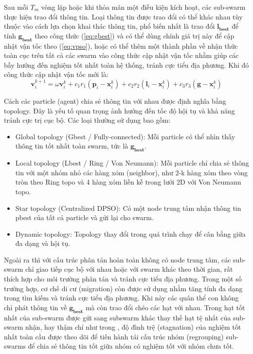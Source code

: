 Sau mỗi $T_m$ vòng lặp hoặc khi thỏa mãn một điều kiện kích hoạt, các sub-swarm thực hiện trao đổi thông tin. Loại thông tin được trao đổi có thể khác nhau tùy thuộc vào cách lựa chọn khai thác thông tin, phổ biến nhất là trao đổi $\mathbf{l_{\text{best}}}$ để tính $\mathbf{g_{\text{best}}}$ theo công thức (\ref{eq:gbest}) và có thể dùng chính giá trị này để cập nhật vận tốc theo (\ref{eq:vpso}), hoặc có thể thêm một thành phần về nhận thức toàn cục trên tất cả các swarm vào công thức cập nhật vận tốc nhằm giúp các bầy hướng đến nghiệm tốt nhất toàn hệ thống, tránh cực tiểu địa phương. Khi đó công thức cập nhật vận tốc mới là:
\begin{equation}
    \mathbf{v}_i^{k+1} = \omega \mathbf{v}_i^{k} + c_1 r_1 (\mathbf{p}_i - \mathbf{x}_i^{k}) + c_2 r_2 (\mathbf{l}_i - \mathbf{x}_i^{k}) + c_3 r_3 (\mathbf{g} - \mathbf{x}_i^{k}) 
\label{eq:vpso2}
\end{equation}


Cách các particle (agent) chia sẻ thông tin với nhau được định nghĩa bằng topology. Đây là yếu tố quan trọng ảnh hưởng đến tốc độ hội tụ và khả năng tránh cực trị cục bộ. Các loại thường sử dụng bao gồm: 
\begin{itemize}
    \item Global topology (Gbest / Fully-connected): Mỗi particle có thể nhìn thấy thông tin tốt nhất toàn swarm, tức là $\mathbf{g_{\text{best}}}$.
    \item Local topology (Lbest / Ring / Von Neumann): Mỗi particle chỉ chia sẻ thông tin với một nhóm nhỏ các hàng xóm (neighbor), như 2-k hàng xóm theo vòng tròn theo Ring topo và 4 hàng xóm liền kề trong lưới 2D với Von Neumann topo.
    \item Star topology (Centralized DPSO): Có một node trung tâm nhận thông tin pbest của tất cả particle và gửi lại cho swarm.
    \item Dynamic topology: Topology thay đổi trong quá trình chạy để cân bằng giữa đa dạng và hội tụ.
\end{itemize}

Ngoài ra thì với cấu trúc phân tán hoàn toàn không có node trung tâm, các sub-swarm chỉ giao tiếp cục bộ với nhau hoặc với swarm khác theo thời gian, rất thích hợp cho môi trường phân tán và tránh cực tiểu địa phương. Trong một số trường hợp, cơ chế di cư (migration) còn được sử dụng nhằm tăng tính đa dạng trong tìm kiếm và tránh cực tiểu địa phương. Khi này các quân thể con không chỉ phát thông tin về $\mathbf{g_{\text{best}}}$ mà còn trao đổi chéo các hạt với nhau. Trong \cite{reyes2006multiswarm} hạt tốt nhất của sub-swarm được gửi sang subswarm khác thay thế hạt tệ nhất của sub-swarm nhận, hay thậm chí như trong \cite{yuan2011multi}, độ đình trệ (stagnation) của nghiệm tốt nhất toàn cầu được theo dõi để tiến hành tái cấu trúc nhóm (regrouping) sub-swarms để chia sẻ thông tin tốt giữa nhóm có nghiệm tốt với nhóm chưa tốt.

